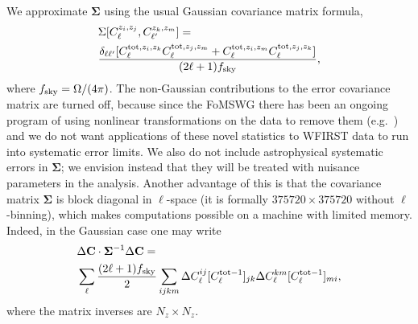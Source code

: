 \documentclass[aps,prd, amsmath,amssymb,superscriptaddress,showkeys,nofootinbib,reprint,preprintnumbers]{revtex4-1}
\begin{document}
We approximate ${\boldsymbol\Sigma}$ using the usual Gaussian
covariance matrix formula,
\begin{align}
&\Sigma[C^{z_i,z_j}_\ell, C^{z_k,z_m}_{\ell'}]= \nonumber\\
& \frac{\delta_{\ell\ell'} [ C^{{\rm tot},z_i,z_k}_\ell C^{{\rm tot},z_j,z_m}_\ell + C^{{\rm tot},z_i,z_m}_\ell C^{{\rm tot},z_j,z_k}_\ell]}{(2\ell+1)f_{\rm sky}} ,
\label{eq:SGauss}
\end{align}
where $f_{\rm sky} = \Omega/(4\pi)$.  The non-Gaussian contributions
to the error covariance matrix are turned off, because since the
FoMSWG \cite{2009arXiv0901.0721A} there has been an ongoing program of
using nonlinear transformations on the data to remove them (e.g.\
\cite{2009ApJ...698L..90N, 2011ApJ...729L..11S}) and
we do not want applications of these novel statistics to WFIRST data
to run into systematic error limits. We also do not include astrophysical systematic errors in ${\boldsymbol\Sigma}$; we envision instead that they will be treated with nuisance parameters in the analysis. Another advantage of this is that the covariance matrix ${\boldsymbol\Sigma}$ is block diagonal in $\ell$-space (it is formally $375720\times375720$ without $\ell$-binning), which makes computations possible on a machine with limited memory. Indeed, in the Gaussian case one may write
\begin{align}
&\Delta{\bf C} \cdot {\boldsymbol\Sigma}^{-1} \Delta {\bf C}=\nonumber\\
& \sum_\ell \frac{(2\ell+1)f_{\rm sky}}2 \sum_{ijkm}
 \Delta C_\ell^{ij} [C^{{\rm tot}-1}_\ell]_{jk}
 \Delta C_\ell^{km} [C^{{\rm tot}-1}_\ell]_{mi},
\label{eq:sprodform}
\end{align}
where the matrix inverses are $N_z\times N_z$.
\end{document}
